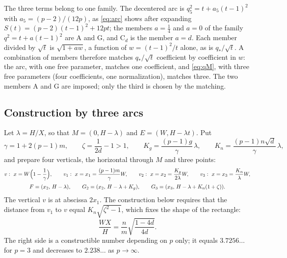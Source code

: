The three terms belong to one family. The decentered arc is $q_5^{2}=t+a_5(t-1)^{2}$ with
$a_5=(p-2)/(12p)$, as \eqref{eq:arc} shows after expanding $S(t)=(p-2)(t-1)^{2}+12pt$; the members $a=\tfrac14$ and $a=0$ of the family $q^{2}=t+a(t-1)^{2}$ are $\mathrm A$
and $\mathrm G$, and $\mathrm C_d$ is the member $a=d$. Each member divided by $\sqrt t$ is
$\sqrt{1+aw}$, a function of $w=(t-1)^{2}/t$ alone, as is $q_*/\sqrt t$. A combination of members
therefore matches $q_*/\sqrt t$ coefficient by coefficient in $w$: the arc, with one free parameter,
matches one coefficient, and \eqref{eq:qM}, with three free parameters (four coefficients, one
normalization), matches three. The two members $\mathrm A$ and $\mathrm G$ are imposed; only the third
is chosen by the matching.

\subsection{Construction by three arcs}\label{sec:mean-construction}

Let $\lambda=H/X$, so that $M=(0,H-\lambda)$ and $E=(W,H-\lambda t)$. Put
\[ \gamma=1+2(p-1)m,\qquad \zeta=\frac1{2d}-1>1,\qquad K_g=\frac{(p-1)g}{\gamma}\,\lambda,\qquad
K_n=\frac{(p-1)n\sqrt d}{\gamma}\,\lambda , \]
and prepare four verticals, the horizontal through $M$ and three points:
\[ \begin{gathered}
v:\ x=W\Bigl(1-\frac1\gamma\Bigr),\qquad v_1:\ x=x_1=\frac{(p-1)m}{\gamma}W,\qquad
v_2:\ x=x_2=\frac{K_g}{2\lambda}W,\qquad v_3:\ x=x_3=\frac{K_n}{\lambda}W,\\[2pt]
F=(x_2,\,H-\lambda),\qquad G_2=(x_2,\,H-\lambda+K_g),\qquad G_3=(x_3,\,H-\lambda+K_n(1+\zeta)).
\end{gathered} \]
The vertical $v$ is at abscissa $2x_1$. The construction below requires that the distance from $v_1$ to
$v$ equal $K_n\sqrt{\zeta^{2}-1}$, which fixes the shape of the rectangle:
\begin{equation}\label{eq:aspect}
\frac{WX}{H}=\frac nm\sqrt{\frac{1-4d}{4d}} .
\end{equation}
The right side is a constructible number depending on $p$ only; it equals $3.7256\ldots$ for $p=3$ and
decreases to $2.238\ldots$ as $p\to\infty$.

